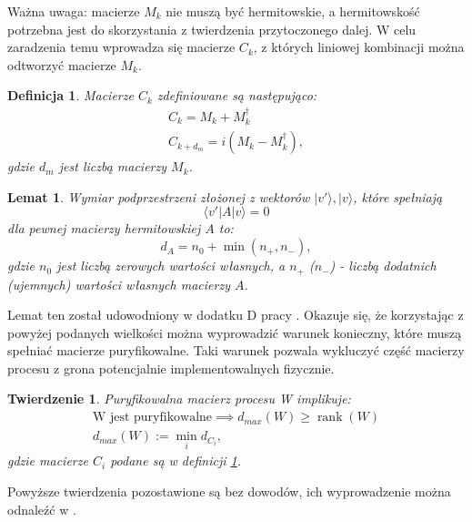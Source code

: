 \documentclass[10pt]{article} %
\newtheorem{definicja}{Definicja}
\newtheorem{tw}{Twierdzenie}
\newtheorem{lm}{Lemat}
\DeclareMathOperator{\Rank}{rank}
\newcommand{\Ket}[1]{|#1\rangle}
\newcommand{\Bra}[1]{\langle#1|}
\newcommand{\LPV}{{L^\perp_V}}
\begin{document}
Ważna uwaga: macierze $M_k$ nie muszą być hermitowskie, a hermitowskość potrzebna jest do skorzystania z twierdzenia przytoczonego dalej. W celu zaradzenia temu wprowadza się macierze $C_k$, z których liniowej kombinacji można odtworzyć macierze $M_k$.
\begin{definicja}
\label{ck}
Macierze $C_k$ zdefiniowane są następująco:
\begin{equation}
\begin{gathered}
C_k = M_k + M_k^\dag \\
C_{k+d_m} = i(M_k - M_k^\dag),
\end{gathered}
\end{equation}
gdzie $d_m$ jest liczbą macierzy $M_k$.
\end{definicja}
\begin{lm}
Wymiar podprzestrzeni złożonej z wektorów $\Ket{v'}, \Ket{v}$, które spełniają
\begin{equation}
\Bra{v'}A\Ket{v} = 0
\end{equation} dla pewnej macierzy hermitowskiej $A$ to:
\begin{equation}
d_{A} = n_{0} + \min(n_{+}, n_{-}),
\end{equation}
gdzie $n_{0}$ jest liczbą zerowych wartości własnych, a $n_{+}$ ($n_{-}$) - liczbą dodatnich (ujemnych) wartości własnych macierzy $A$. 
\end{lm}
Lemat ten został udowodniony w dodatku D pracy \cite{purification}.
Okazuje się, że korzystając z powyżej podanych wielkości można wyprowadzić warunek konieczny, które muszą spełniać macierze puryfikowalne. Taki warunek pozwala wykluczyć część macierzy procesu z grona potencjalnie implementowalnych fizycznie.
\begin{tw}
Puryfikowalna macierz procesu W implikuje:
\begin{gather}
\text{W jest puryfikowalne} \implies d_{max}(W) \geq \Rank(W) \\
d_{max}(W) := \min_i d_{C_i} ,
\end{gather}
gdzie macierze $C_i$ podane są w definicji \ref{ck}.
\end{tw}
Powyższe twierdzenia pozostawione są bez dowodów, ich wyprowadzenie można odnaleźć w \cite{purification}.
\end{document}
